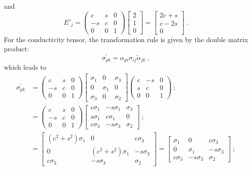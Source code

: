 and 
\[
	E'_j = \begin{pmatrix}c & s & 0\\ -s & c & 0\\ 0 & 0 & 1\end{pmatrix} \begin{bmatrix} 2\\ 1\\ 0\end{bmatrix} = \begin{bmatrix} 2c+s\\ c-2s\\ 0\end{bmatrix}\ .
\]
For the conductivity tensor, the transformation rule is given by the double matrix product:
\[
	\sigma^{\prime}_{pk}= \alpha_{pi}\sigma_{ij} \widetilde{\alpha}_{jk}\ ,
\]
which leads to 
\begin{equation*}
\begin{split}
	\sigma^{\prime}_{pk}&= \begin{pmatrix}c & s & 0\\ -s & c & 0\\ 0 & 0 & 1\end{pmatrix} \begin{bmatrix}\sigma_1 & 0 & \sigma_3\\
0 & \sigma_1 & 0\\
\sigma_3 & 0 & \sigma_2\end{bmatrix} \begin{pmatrix}c & -s & 0\\ s & c & 0\\ 0 & 0 & 1\end{pmatrix}\ ;\\
&= \begin{pmatrix}c & s & 0\\ -s & c & 0\\ 0 & 0 & 1\end{pmatrix}  \begin{bmatrix}c\sigma_1 & -s\sigma_1 & \sigma_3\\
s\sigma_1 & c\sigma_1 & 0\\
c\sigma_3 & -s\sigma_3 & \sigma_2\end{bmatrix}\ ;\\
&= \begin{bmatrix}(c^2+s^2)\sigma_1 & 0 & c\sigma_3\\
0 & (c^2+s^2)\sigma_1 & -s\sigma_3\\
c\sigma_3 & -s\sigma_3 & \sigma_2\end{bmatrix}= \begin{bmatrix}\sigma_1 & 0 & c\sigma_3\\
0 & \sigma_1 & -s\sigma_3\\
c\sigma_3 & -s\sigma_3 & \sigma_2\end{bmatrix}\ ;
\end{split}
\end{equation*}
